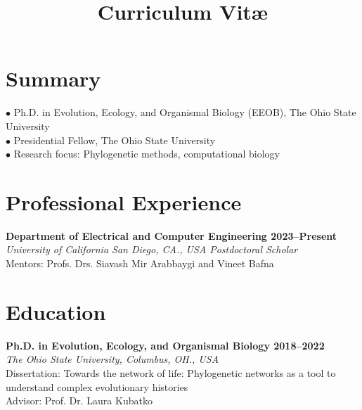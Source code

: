 \documentclass[11pt,letterpaper,sans]{moderncv} %
\title{Curriculum Vitæ}
\begin{document}
\makecvtitle %

\section{Summary}
$\bullet{}$ Ph.D. in Evolution, Ecology, and Organismal Biology (EEOB), The Ohio State University\\
$\bullet{}$ Presidential Fellow, The Ohio State University\\
$\bullet{}$ Research focus: Phylogenetic methods, computational biology\\

\section{Professional Experience}
\textbf{Department of Electrical and Computer Engineering  \hfill 2023--Present}\\
\textit{University of California San Diego, CA., USA \hfill Postdoctoral Scholar}\\
Mentors: Profs. Drs. Siavash Mir Arabbaygi and Vineet Bafna

\section{Education}
\textbf{Ph.D. in Evolution, Ecology, and Organismal Biology \hfill 2018--2022}\\
\textit{The Ohio State University, Columbus, OH., USA}\\
Dissertation: Towards the network of life: Phylogenetic networks as a tool to understand complex evolutionary histories\\
Advisor: Prof. Dr. Laura Kubatko\\
\end{document}
